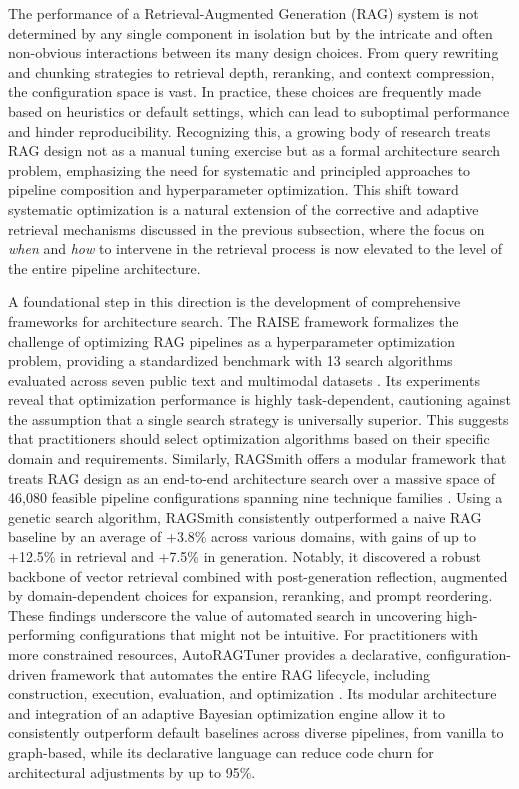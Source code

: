 \documentclass[11pt]{article}
\begin{document}
The performance of a Retrieval-Augmented Generation (RAG) system is not determined by any single component in isolation but by the intricate and often non-obvious interactions between its many design choices. From query rewriting and chunking strategies to retrieval depth, reranking, and context compression, the configuration space is vast. In practice, these choices are frequently made based on heuristics or default settings, which can lead to suboptimal performance and hinder reproducibility. Recognizing this, a growing body of research treats RAG design not as a manual tuning exercise but as a formal architecture search problem, emphasizing the need for systematic and principled approaches to pipeline composition and hyperparameter optimization. This shift toward systematic optimization is a natural extension of the corrective and adaptive retrieval mechanisms discussed in the previous subsection, where the focus on \emph{when} and \emph{how} to intervene in the retrieval process is now elevated to the level of the entire pipeline architecture.

A foundational step in this direction is the development of comprehensive frameworks for architecture search. The RAISE framework formalizes the challenge of optimizing RAG pipelines as a hyperparameter optimization problem, providing a standardized benchmark with 13 search algorithms evaluated across seven public text and multimodal datasets \cite{ref144}. Its experiments reveal that optimization performance is highly task-dependent, cautioning against the assumption that a single search strategy is universally superior. This suggests that practitioners should select optimization algorithms based on their specific domain and requirements. Similarly, RAGSmith offers a modular framework that treats RAG design as an end-to-end architecture search over a massive space of 46,080 feasible pipeline configurations spanning nine technique families \cite{ref145}. Using a genetic search algorithm, RAGSmith consistently outperformed a naive RAG baseline by an average of +3.8\% across various domains, with gains of up to +12.5\% in retrieval and +7.5\% in generation. Notably, it discovered a robust backbone of vector retrieval combined with post-generation reflection, augmented by domain-dependent choices for expansion, reranking, and prompt reordering. These findings underscore the value of automated search in uncovering high-performing configurations that might not be intuitive. For practitioners with more constrained resources, AutoRAGTuner provides a declarative, configuration-driven framework that automates the entire RAG lifecycle, including construction, execution, evaluation, and optimization \cite{ref146}. Its modular architecture and integration of an adaptive Bayesian optimization engine allow it to consistently outperform default baselines across diverse pipelines, from vanilla to graph-based, while its declarative language can reduce code churn for architectural adjustments by up to 95\%.
\end{document}
